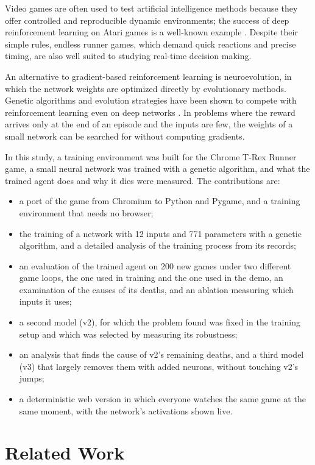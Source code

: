 \documentclass[11pt,a4paper]{article}
\begin{document}
Video games are often used to test artificial intelligence methods because they offer controlled and reproducible dynamic environments; the success of deep reinforcement learning on Atari games is a well-known example \cite{mnih2015}. Despite their simple rules, endless runner games, which demand quick reactions and precise timing, are also well suited to studying real-time decision making.

An alternative to gradient-based reinforcement learning is neuroevolution, in which the network weights are optimized directly by evolutionary methods. Genetic algorithms and evolution strategies have been shown to compete with reinforcement learning even on deep networks \cite{such2017,salimans2017}. In problems where the reward arrives only at the end of an episode and the inputs are few, the weights of a small network can be searched for without computing gradients.

In this study, a training environment was built for the Chrome T-Rex Runner game, a small neural network was trained with a genetic algorithm, and what the trained agent does and why it dies were measured. The contributions are:
\begin{itemize}
  \item a port of the game from Chromium to Python and Pygame, and a training environment that needs no browser;
  \item the training of a network with 12 inputs and 771 parameters with a genetic algorithm, and a detailed analysis of the training process from its records;
  \item an evaluation of the trained agent on 200 new games under two different game loops, the one used in training and the one used in the demo, an examination of the causes of its deaths, and an ablation measuring which inputs it uses;
  \item a second model (v2), for which the problem found was fixed in the training setup and which was selected by measuring its robustness;
  \item an analysis that finds the cause of v2's remaining deaths, and a third model (v3) that largely removes them with added neurons, without touching v2's jumps;
  \item a deterministic web version in which everyone watches the same game at the same moment, with the network's activations shown live.
\end{itemize}

\section{Related Work}
\end{document}
